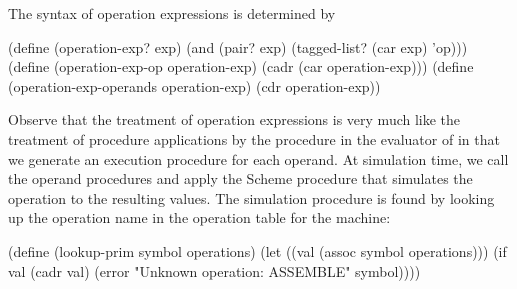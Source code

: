 \noindent
The syntax of operation expressions is determined by

\begin{codeBlock}
(define (operation-exp? exp)
  (and (pair? exp) (tagged-list? (car exp) 'op)))
(define (operation-exp-op operation-exp)
  (cadr (car operation-exp)))
(define (operation-exp-operands operation-exp)
  (cdr operation-exp))
\end{codeBlock}

\noindent
Observe that the treatment of operation expressions is very much like the
treatment of procedure applications by the  procedure
in the evaluator of  in that we generate an execution
procedure for each operand.  At simulation time, we call the operand procedures
and apply the Scheme procedure that simulates the operation to the resulting
values.  The simulation procedure is found by looking up the operation name in
the operation table for the machine:

\begin{codeBlock}
(define (lookup-prim symbol operations)
  (let ((val (assoc symbol operations)))
    (if val
        (cadr val)
        (error "Unknown operation: ASSEMBLE"
               symbol))))
\end{codeBlock}

